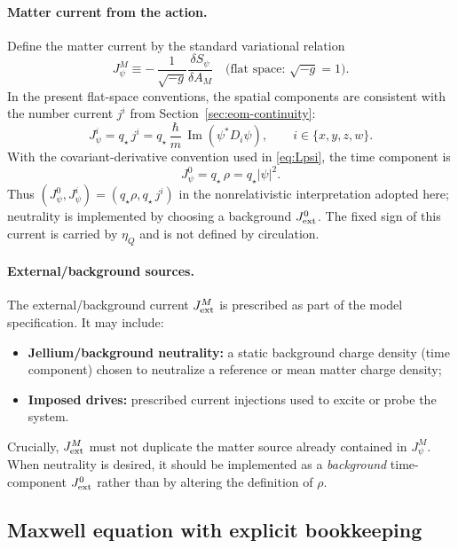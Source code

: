 \documentclass[11pt]{article}
\newcommand{\etaQ}{\eta_Q}
\newcommand{\qstar}{q_\star}
\begin{document}
\paragraph{Matter current from the action.}
Define the matter current by the standard variational relation
\begin{equation}
\boxed{
J_\psi^M \equiv -\,\frac{1}{\sqrt{-g}}\frac{\delta S_\psi}{\delta A_M}
\quad \text{(flat space: } \sqrt{-g}=1\text{)}.
}
\label{eq:Jpsi-variational}
\end{equation}
In the present flat-space conventions, the spatial components are consistent with the number current $j^i$ from Section~\ref{sec:eom-continuity}:
\begin{equation}
J_\psi^i = \qstar\,j^i
=
\qstar\,\frac{\hbar}{m}\,\operatorname{Im}\!\left(\psi^*D_i\psi\right),
\qquad i\in\{x,y,z,w\}.
\label{eq:Jpsi-spatial}
\end{equation}
With the covariant-derivative convention used in \eqref{eq:Lpsi}, the time component is
\begin{equation}
J_\psi^0 = \qstar\,\rho = \qstar|\psi|^2.
\label{eq:Jpsi-time}
\end{equation}
Thus $(J_\psi^0,J_\psi^i)=(\qstar\rho, \qstar\,j^i)$ in the nonrelativistic interpretation adopted here; neutrality is implemented by choosing a background $J_{\rm ext}^0$. The fixed sign of this current is carried by $\etaQ$ and is not defined by circulation.

\paragraph{External/background sources.}
The external/background current $J_{\rm ext}^M$ is prescribed as part of the model specification. It may include:
\begin{itemize}[leftmargin=2.0em]
\item \textbf{Jellium/background neutrality:} a static background charge density (time component) chosen to neutralize a reference or mean matter charge density;
\item \textbf{Imposed drives:} prescribed current injections used to excite or probe the system.
\end{itemize}
Crucially, $J_{\rm ext}^M$ must not duplicate the matter source already contained in $J_\psi^M$. When neutrality is desired, it should be implemented as a \emph{background} time-component $J_{\rm ext}^0$ rather than by altering the definition of $\rho$.

\subsection{Maxwell equation with explicit bookkeeping}
\label{app:maxwell-bookkeeping}
\end{document}
